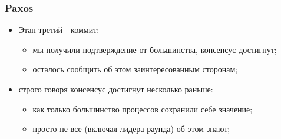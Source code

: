 \begin{frame}
\frametitle{Paxos}
\begin{itemize}
  \item Этап третий - коммит:
    \begin{itemize}
      \item мы получили подтверждение от большинства, консенсус достигнут;
      \item осталось сообщить об этом заинтересованным сторонам;
    \end{itemize}
  \item строго говоря консенсус достигнут несколько раньше:
    \begin{itemize}
      \item как только большинство процессов сохранили себе значение;
      \item просто не все (включая лидера раунда) об этом знают;
    \end{itemize}
\end{itemize}
\end{frame}
